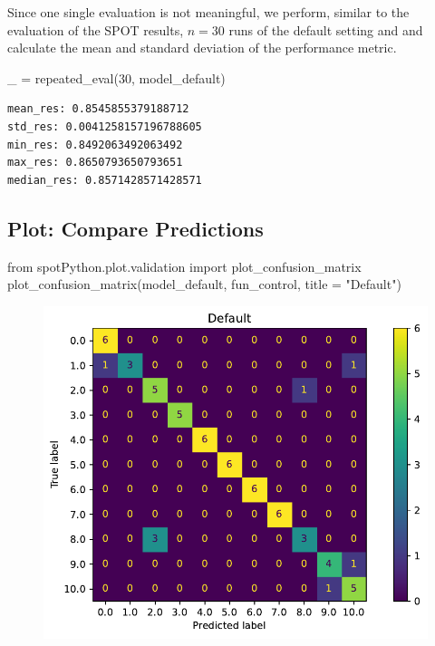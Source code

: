 \documentclass[
  letterpaper,
  DIV=11,
  numbers=noendperiod]{scrreprt}
\newenvironment{Shaded}{\begin{snugshade}}{\end{snugshade}}
\newcommand{\DecValTok}[1]{\textcolor[rgb]{0.68,0.00,0.00}{#1}}
\newcommand{\ImportTok}[1]{\textcolor[rgb]{0.00,0.46,0.62}{#1}}
\newcommand{\NormalTok}[1]{\textcolor[rgb]{0.00,0.23,0.31}{#1}}
\newcommand{\OperatorTok}[1]{\textcolor[rgb]{0.37,0.37,0.37}{#1}}
\newcommand{\StringTok}[1]{\textcolor[rgb]{0.13,0.47,0.30}{#1}}
\begin{document}
Since one single evaluation is not meaningful, we perform, similar to
the evaluation of the SPOT results, \(n=30\) runs of the default setting
and and calculate the mean and standard deviation of the performance
metric.

\begin{Shaded}
\begin{Highlighting}[]
\NormalTok{\_ }\OperatorTok{=}\NormalTok{ repeated\_eval(}\DecValTok{30}\NormalTok{, model\_default)}
\end{Highlighting}
\end{Shaded}

\begin{verbatim}
mean_res: 0.8545855379188712
std_res: 0.0041258157196788605
min_res: 0.8492063492063492
max_res: 0.8650793650793651
median_res: 0.8571428571428571
\end{verbatim}

\hypertarget{plot-compare-predictions-3}{%
\subsection{Plot: Compare
Predictions}\label{plot-compare-predictions-3}}

\begin{Shaded}
\begin{Highlighting}[]
\ImportTok{from}\NormalTok{ spotPython.plot.validation }\ImportTok{import}\NormalTok{ plot\_confusion\_matrix}
\NormalTok{plot\_confusion\_matrix(model\_default, fun\_control, title }\OperatorTok{=} \StringTok{"Default"}\NormalTok{)}
\end{Highlighting}
\end{Shaded}

\begin{figure}[H]

{\centering \includegraphics{18_spot_hpt_sklearn_multiclass_classification_svc_files/figure-pdf/cell-41-output-1.pdf}

}

\end{figure}
\end{document}

